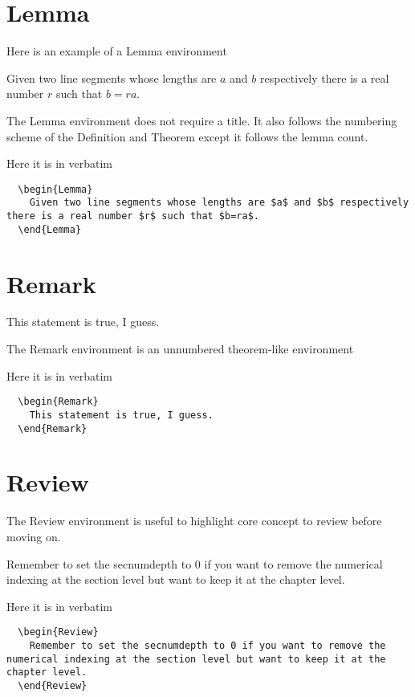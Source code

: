 \documentclass[letterpaper,10pt,twoside,onecolumn,openany,draft]{book}
\begin{document}
\section{Lemma}
Here is an example of a Lemma environment
\begin{Lemma}
  Given two line segments whose lengths are $a$ and $b$ respectively there is a real number $r$ such that $b=ra$.
\end{Lemma}
The Lemma environment does not require a title. It also follows the numbering scheme of the Definition and Theorem except it follows the lemma count.

Here it is in verbatim
\begin{verbatim}
  \begin{Lemma}
    Given two line segments whose lengths are $a$ and $b$ respectively there is a real number $r$ such that $b=ra$.
  \end{Lemma}
\end{verbatim}


\section{Remark}
\begin{Remark}
  This statement is true, I guess.
\end{Remark}
The Remark environment is an unnumbered theorem-like environment

Here it is in verbatim
\begin{verbatim}
  \begin{Remark}
    This statement is true, I guess.
  \end{Remark} 
\end{verbatim}

\section{Review}
The Review environment is useful to highlight core concept to review before moving on.
\begin{Review}
  Remember to set the secnumdepth to 0 if you want to remove the numerical indexing at the section level but want to keep it at the chapter level.
\end{Review}

Here it is in verbatim
\begin{verbatim}
  \begin{Review}
    Remember to set the secnumdepth to 0 if you want to remove the numerical indexing at the section level but want to keep it at the chapter level.
  \end{Review} 
\end{verbatim}
\end{document}
